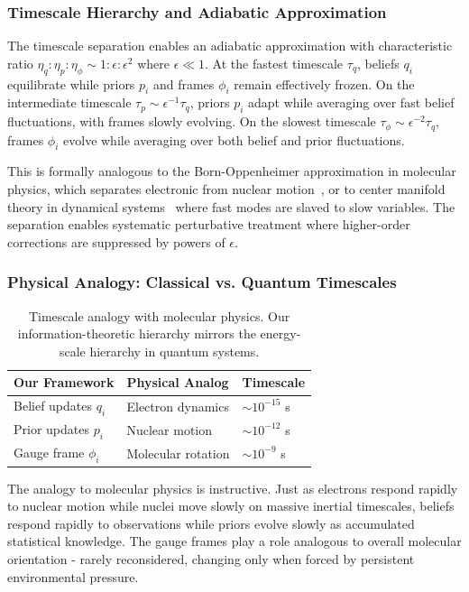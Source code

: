 \documentclass[11pt]{article}
\begin{document}
\subsubsection{Timescale Hierarchy and Adiabatic Approximation}

The timescale separation enables an adiabatic approximation with characteristic ratio $\eta_q : \eta_p : \eta_\phi \sim 1 : \epsilon : \epsilon^2$ where $\epsilon \ll 1$. At the fastest timescale $\tau_q$, beliefs $q_i$ equilibrate while priors $p_i$ and frames $\phi_i$ remain effectively frozen. On the intermediate timescale $\tau_p \sim \epsilon^{-1} \tau_q$, priors $p_i$ adapt while averaging over fast belief fluctuations, with frames slowly evolving. On the slowest timescale $\tau_\phi \sim \epsilon^{-2} \tau_q$, frames $\phi_i$ evolve while averaging over both belief and prior fluctuations.

This is formally analogous to the Born-Oppenheimer approximation in molecular physics, which separates electronic from nuclear motion~\cite{Born1927}, or to center manifold theory in dynamical systems~\cite{Carr1981} where fast modes are slaved to slow variables. The separation enables systematic perturbative treatment where higher-order corrections are suppressed by powers of $\epsilon$.

\subsubsection{Physical Analogy: Classical vs. Quantum Timescales}

\begin{table}[h]
\centering
\begin{tabular}{|l|l|l|}
\hline
\textbf{Our Framework} & \textbf{Physical Analog} & \textbf{Timescale} \\
\hline
Belief updates $q_i$ & Electron dynamics & $\sim 10^{-15}$ s \\
Prior updates $p_i$ & Nuclear motion & $\sim 10^{-12}$ s \\
Gauge frame $\phi_i$ & Molecular rotation & $\sim 10^{-9}$ s \\
\hline
\end{tabular}
\caption{Timescale analogy with molecular physics. Our information-theoretic hierarchy mirrors the energy-scale hierarchy in quantum systems.}
\end{table}

The analogy to molecular physics is instructive. Just as electrons respond rapidly to nuclear motion while nuclei move slowly on massive inertial timescales, beliefs respond rapidly to observations while priors evolve slowly as accumulated statistical knowledge. The gauge frames play a role analogous to overall molecular orientation - rarely reconsidered, changing only when forced by persistent environmental pressure.
\end{document}
